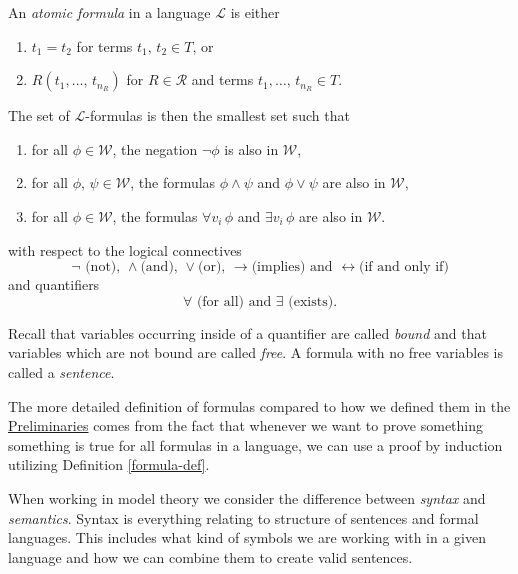 \documentclass[../../main.tex]{subfiles}
\begin{document}
\begin{definition}\cite[Definition 1.1.5]{Mar02}\label{formula-def}
    An \textit{atomic formula} in a language $\mathcal{L}$ is either
    \begin{enumerate}
        \item $t_1 = t_2$ for terms $t_1,\, t_2 \in T$, or   
        \item $R(t_1,\ldots,\, t_{n_R})$ for $R \in \mathcal{R}$ and terms $t_1,\ldots,\, t_{n_R} \in T$.
    \end{enumerate}

    The set of $\mathcal{L}$-formulas is then the smallest set such that
    \begin{enumerate}[label=(\roman*)]
        \item for all $\phi \in \mathcal{W}$, the negation $\lnot \phi$ is also in $\mathcal{W}$,
        \item for all $\phi,\, \psi \in \mathcal{W}$, the formulas $\phi \wedge \psi$ and $\phi \vee \psi$ are also in $\mathcal{W}$,
        \item for all $\phi \in \mathcal{W}$, the formulas $\forall v_i \, \phi$ and $\exists v_i \, \phi$ are also in $\mathcal{W}$.
    \end{enumerate}
    with respect to the logical connectives 
    $$\lnot \text{ (not), } \wedge \text{(and), } \vee \text{(or), } \rightarrow \text{(implies) and } \leftrightarrow \text{(if and only if)}$$
    and quantifiers $$\forall \text{ (for all) and } \exists \text{ (exists)}.$$
    
    Recall that variables occurring inside of a quantifier are called \textit{bound} and that variables which are not bound are called \textit{free}.
    A formula with no free variables is called a \textit{sentence}.
\end{definition}

The more detailed definition of formulas compared to how we defined them in the \hyperref[preliminaries]{Preliminaries} comes from the fact that 
whenever we want to prove something something is true for all formulas in a language, we can use a proof by induction utilizing Definition \ref{formula-def}.

When working in model theory we consider the difference between \textit{syntax} and \textit{semantics}.
Syntax is everything relating to structure of sentences and formal languages.
This includes what kind of symbols we are working with in a given language and how we can combine them to create valid sentences.
\end{document}
